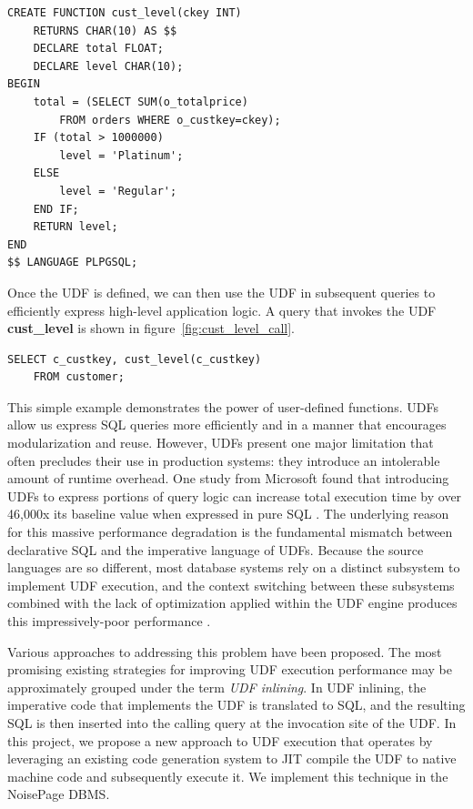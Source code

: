 \documentclass{vldb}
\newcommand{\dbCode}[1]{{\sffamily\small \textbf{#1}}\xspace}
\begin{document}
\begin{listing}[H]
    \begin{verbatim}
CREATE FUNCTION cust_level(ckey INT)
    RETURNS CHAR(10) AS $$
    DECLARE total FLOAT;
    DECLARE level CHAR(10);
BEGIN
    total = (SELECT SUM(o_totalprice) 
        FROM orders WHERE o_custkey=ckey);
    IF (total > 1000000)
        level = 'Platinum';
    ELSE
        level = 'Regular';
    END IF;
    RETURN level;
END 
$$ LANGUAGE PLPGSQL;
    \end{verbatim}
    \caption{The definition of UDF \dbCode{cust\_level}.}
    \label{fig:cust_level_def}
\end{listing}

Once the UDF is defined, we can then use the UDF in subsequent queries to efficiently express high-level application logic. A query that invokes the UDF \dbCode{cust\_level} is shown in figure~\ref{fig:cust_level_call}.
    
\begin{listing}[H]
    \begin{verbatim}
SELECT c_custkey, cust_level(c_custkey)
    FROM customer;
    \end{verbatim}
    \caption{The invocation of UDF \dbCode{cust\_level}.}
    \label{fig:cust_level_call}
\end{listing}

This simple example demonstrates the power of user-defined functions. UDFs allow us express SQL queries more efficiently and in a manner that encourages modularization and reuse. However, UDFs present one major limitation that often precludes their use in production systems: they introduce an intolerable amount of runtime overhead. One study from Microsoft found that introducing UDFs to express portions of query logic can increase total execution time by over 46,000x its baseline value when expressed in pure SQL \cite{froid}. The underlying reason for this massive performance degradation is the fundamental mismatch between declarative SQL and the imperative language of UDFs. Because the source languages are so different, most database systems rely on a distinct subsystem to implement UDF execution, and the context switching between these subsystems combined with the lack of optimization applied within the UDF engine produces this impressively-poor performance \cite{froid, apfel}.

Various approaches to addressing this problem have been proposed. The most promising existing strategies for improving UDF execution performance may be approximately grouped under the term \textit{UDF inlining}. In UDF inlining, the imperative code that implements the UDF is translated to SQL, and the resulting SQL is then inserted into the calling query at the invocation site of the UDF. In this project, we propose a new approach to UDF execution that operates by leveraging an existing code generation system to JIT compile the UDF to native machine code and subsequently execute it. We implement this technique in the NoisePage \cite{noisepage} DBMS.
\end{document}
